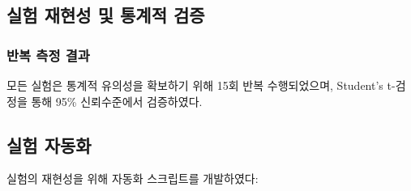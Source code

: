 \documentclass[twocolumn,10pt]{article}
\begin{document}
\subsection{실험 재현성 및 통계적 검증}

\subsubsection{반복 측정 결과}

모든 실험은 통계적 유의성을 확보하기 위해 15회 반복 수행되었으며, Student's t-검정을 통해 95\% 신뢰수준에서 검증하였다.

\subsection{실험 자동화}

실험의 재현성을 위해 자동화 스크립트를 개발하였다:
\end{document}
